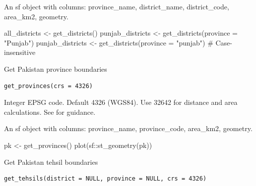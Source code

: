 \documentclass[a4paper]{book}
\begin{document}
%
\begin{Value}
An sf object with columns: province\_name, district\_name,
district\_code, area\_km2, geometry.
\end{Value}
%
\begin{Examples}
\begin{ExampleCode}

  all_districts    <- get_districts()
  punjab_districts <- get_districts(province = "Punjab")
  punjab_districts <- get_districts(province = "punjab")  # Case-insensitive

\end{ExampleCode}
\end{Examples}
%
\begin{Description}
Get Pakistan province boundaries
\end{Description}
%
\begin{Usage}
\begin{verbatim}
get_provinces(crs = 4326)
\end{verbatim}
\end{Usage}
%
\begin{Arguments}
\begin{ldescription}
\item[\code{crs}] Integer EPSG code. Default 4326 (WGS84). Use 32642 for
distance and area calculations. See  for guidance.
\end{ldescription}
\end{Arguments}
%
\begin{Value}
An sf object with columns: province\_name, province\_code,
area\_km2, geometry.
\end{Value}
%
\begin{Examples}
\begin{ExampleCode}

  pk <- get_provinces()
  plot(sf::st_geometry(pk))

\end{ExampleCode}
\end{Examples}
%
\begin{Description}
Get Pakistan tehsil boundaries
\end{Description}
%
\begin{Usage}
\begin{verbatim}
get_tehsils(district = NULL, province = NULL, crs = 4326)
\end{verbatim}
\end{Usage}
\end{document}
